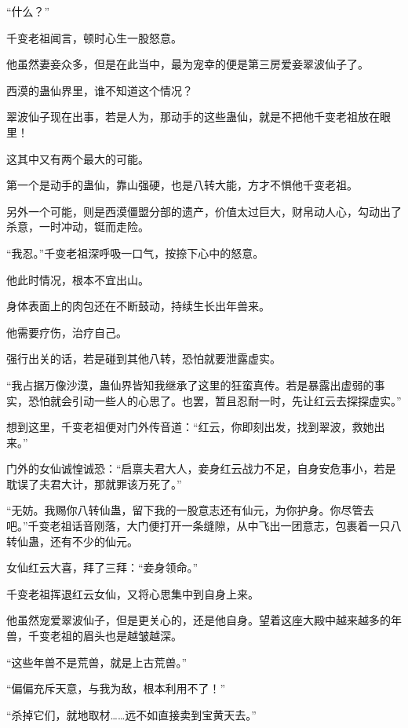 
\begin{this_body}

“什么？”

千变老祖闻言，顿时心生一股怒意。

他虽然妻妾众多，但是在此当中，最为宠幸的便是第三房爱妾翠波仙子了。

西漠的蛊仙界里，谁不知道这个情况？

翠波仙子现在出事，若是人为，那动手的这些蛊仙，就是不把他千变老祖放在眼里！

这其中又有两个最大的可能。

第一个是动手的蛊仙，靠山强硬，也是八转大能，方才不惧他千变老祖。

另外一个可能，则是西漠僵盟分部的遗产，价值太过巨大，财帛动人心，勾动出了杀意，一时冲动，铤而走险。

“我忍。”千变老祖深呼吸一口气，按捺下心中的怒意。

他此时情况，根本不宜出山。

身体表面上的肉包还在不断鼓动，持续生长出年兽来。

他需要疗伤，治疗自己。

强行出关的话，若是碰到其他八转，恐怕就要泄露虚实。

“我占据万像沙漠，蛊仙界皆知我继承了这里的狂蛮真传。若是暴露出虚弱的事实，恐怕就会引动一些人的心思了。也罢，暂且忍耐一时，先让红云去探探虚实。”

想到这里，千变老祖便对门外传音道：“红云，你即刻出发，找到翠波，救她出来。”

门外的女仙诚惶诚恐：“启禀夫君大人，妾身红云战力不足，自身安危事小，若是耽误了夫君大计，那就罪该万死了。”

“无妨。我赐你八转仙蛊，留下我的一股意志还有仙元，为你护身。你尽管去吧。”千变老祖话音刚落，大门便打开一条缝隙，从中飞出一团意志，包裹着一只八转仙蛊，还有不少的仙元。

女仙红云大喜，拜了三拜：“妾身领命。”

千变老祖挥退红云女仙，又将心思集中到自身上来。

他虽然宠爱翠波仙子，但是更关心的，还是他自身。望着这座大殿中越来越多的年兽，千变老祖的眉头也是越皱越深。

“这些年兽不是荒兽，就是上古荒兽。”

“偏偏充斥天意，与我为敌，根本利用不了！”

“杀掉它们，就地取材……远不如直接卖到宝黄天去。”


\end{this_body}
